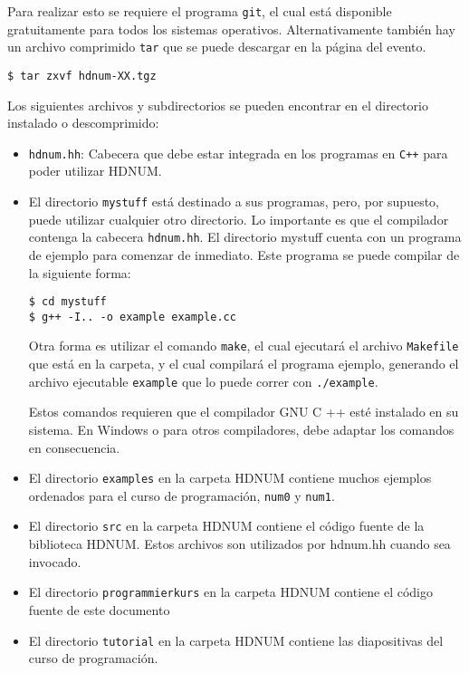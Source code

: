 Para realizar esto se requiere el programa \lstinline{git}, el cual está disponible gratuitamente para todos los sistemas operativos. Alternativamente también hay un archivo comprimido \lstinline{tar} que se puede descargar en la página del evento.
\begin{lstlisting}[basicstyle=\ttfamily\small,frame=single]
$ tar zxvf hdnum-XX.tgz
\end{lstlisting}
Los siguientes archivos y subdirectorios se pueden encontrar en el directorio instalado o descomprimido:
\begin{itemize}
\item \lstinline{hdnum.hh}: Cabecera que debe estar integrada en los programas en \lstinline{C++} para poder utilizar HDNUM.
\item 
El directorio \lstinline{mystuff} está destinado a sus programas, pero, por supuesto, puede utilizar cualquier otro directorio. Lo  importante es que el compilador contenga la cabecera \lstinline{hdnum.hh}. El directorio mystuff cuenta con un programa de ejemplo para comenzar de inmediato. Este programa se puede compilar de la siguiente forma:

\begin{lstlisting}[basicstyle=\ttfamily\small,frame=single]
$ cd mystuff
$ g++ -I.. -o example example.cc
\end{lstlisting}
Otra forma es utilizar el comando \lstinline{make}, el cual ejecutará el archivo \lstinline{Makefile} que está en la carpeta, y el cual compilará el programa ejemplo, generando el archivo ejecutable \lstinline{example} que lo puede correr con \lstinline{./example}.

Estos comandos requieren que el compilador GNU C ++ esté instalado en su sistema. En Windows o para otros compiladores, debe adaptar los comandos en consecuencia.

\item El directorio \lstinline{examples} en la carpeta HDNUM contiene muchos ejemplos ordenados para el curso de programación, \lstinline{num0} y \lstinline{num1}.
\item El directorio \lstinline{src} en la carpeta HDNUM contiene el código fuente de la biblioteca HDNUM. Estos archivos son utilizados por hdnum.hh cuando sea invocado.
\item El directorio \lstinline{programmierkurs} en la carpeta HDNUM contiene el código fuente de este documento
\item El directorio \lstinline{tutorial}  en la carpeta HDNUM contiene las diapositivas del curso de programación.
\end{itemize}

